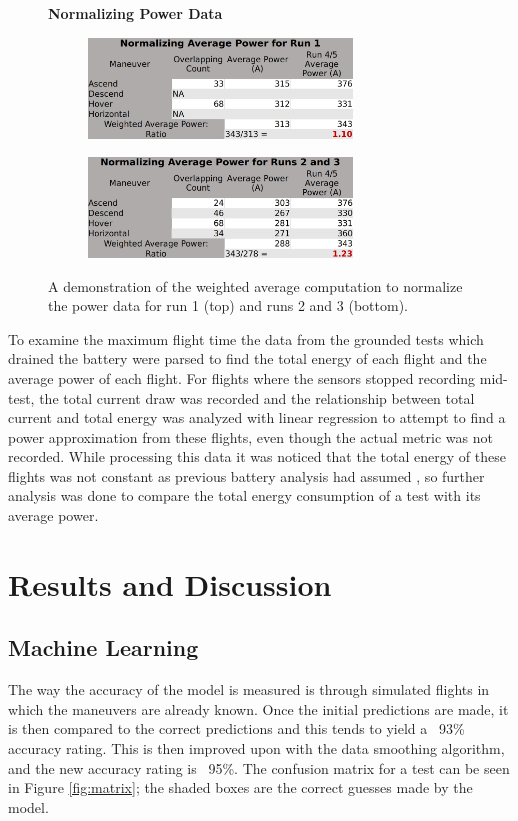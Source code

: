 \documentclass{article}
\begin{document}
\begin{figure}[!h]
\centering
\large{\textbf{Normalizing Power Data}}\par
\begin{subfigure}[b]{0.5\textwidth}
  \centering
   \includegraphics[width=70mm]{images/Normalizing1.png}
  \label{fig:sub1}
\end{subfigure}%
\begin{subfigure}[b]{0.5\textwidth}
  \centering
  \includegraphics[width=70mm]{images/Normalizing2.png}
  \label{fig:sub2}
\end{subfigure}
\caption{A demonstration of the weighted average computation to normalize the power data for run 1 (top) and runs 2 and 3 (bottom).}
\label{fig:Norm}
\end{figure}

To examine the maximum flight time the data from the grounded tests which drained the battery were parsed to find the total energy of each flight and the average power of each flight. For flights where the sensors stopped recording mid-test, the total current draw was recorded and the relationship between total current and total energy was analyzed with linear regression to attempt to find a power approximation from these flights, even though the actual metric was not recorded. While processing this data it was noticed that the total energy of these flights was not constant as previous battery analysis had assumed \cite{Prasetia}, so further analysis was done to compare the total energy consumption of a test with its average power.


\section{Results and Discussion}


\subsection{Machine Learning}
The way the accuracy of the model is measured is through simulated flights in which the maneuvers are already known. Once the initial predictions are made, it is then compared to the correct predictions and this tends to yield a ~93\% accuracy rating. This is then improved upon with the data smoothing algorithm, and the new accuracy rating is ~95\%. The confusion matrix for a test can be seen in Figure \ref{fig:matrix}; the shaded boxes are the correct guesses made by the model. 
\end{document}
